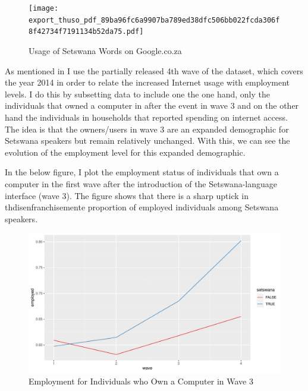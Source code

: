 \documentclass[a4paper,british]{article}\usepackage[]{graphicx}\usepackage[]{xcolor}
\makeatletter
\def\maxwidth{ %
  \ifdim\Gin@nat@width>\linewidth
    \linewidth
  \else
    \Gin@nat@width
  \fi
}
\newenvironment{knitrout}{}{} %
\makeatother
\begin{document}
\begin{figure}[H]
\caption{Usage of Setswana Words on Google.co.za}

\begin{centering}
\label{fig:GoogleTrendsZA}
\par\end{centering}
\begin{centering}
\par\end{centering}
\centering{}\texttt{[image: export\_thuso\_pdf\_89ba96fc6a9907ba789ed38dfc506bb022fcda306f8f42734f7191134b52da75.pdf]} 
\end{figure}

As mentioned in  I use the partially released 4th wave
of the dataset, which covers the year 2014 in order to relate the
increased Internet usage with employment levels. I do this by subsetting
data to include one the one hand, only the individuals that owned
a computer in after the event in wave 3 and on the other hand the
individuals in households that reported spending on internet access.
The idea is that the owners/users in wave 3 are an expanded demographic
for Setswana speakers but remain relatively unchanged. With this,
we can see the evolution of the employment level for this expanded
demographic.

In the below figure, I plot the employment status of individuals that
own a computer in the first wave after the introduction of the Setswana-language
interface (wave 3). The figure shows that there is a sharp uptick
in thdisenfranchisemente proportion of employed individuals among
Setswana speakers. 

\begin{figure}[H]
\caption{Employment for Individuals who Own a Computer in Wave 3}

\begin{knitrout}
\color{fgcolor}
\includegraphics[width=\maxwidth]{../misc/latex-employment_own_computer-1} 
\end{knitrout}
\end{figure}
\end{document}
